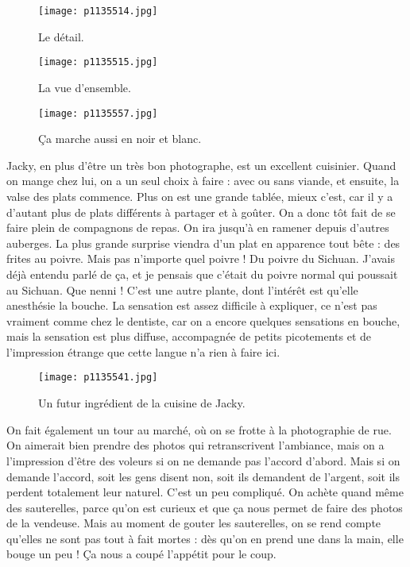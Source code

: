 \documentclass{book}
\begin{document}
\begin{figure}[h]
\centering
\texttt{[image: p1135514.jpg]}
\caption*{Le détail.}
\end{figure}


\begin{figure}[h]
\centering
\texttt{[image: p1135515.jpg]}
\caption*{La vue d'ensemble.}
\end{figure}


\begin{figure}[h]
\centering
\texttt{[image: p1135557.jpg]}
\caption*{Ça marche aussi en noir et blanc.}
\end{figure}

Jacky, en plus d'être un très bon photographe, est un excellent cuisinier. Quand on mange chez lui, on a un seul choix à faire : avec ou sans viande, et ensuite, la valse des plats commence. Plus on est une grande tablée, mieux c'est, car il y a d'autant plus de plats différents à partager et à goûter. On a donc tôt fait de se faire plein de compagnons de repas. On ira jusqu'à en ramener depuis d'autres auberges. La plus grande surprise viendra d'un plat en apparence tout bête : des frites au poivre. Mais pas n'importe quel poivre ! Du poivre du Sichuan. J'avais déjà entendu parlé de ça, et je pensais que c'était du poivre normal qui poussait au Sichuan. Que nenni ! C'est une autre plante, dont l'intérêt est qu'elle anesthésie la bouche. La sensation est assez difficile à expliquer, ce n'est pas vraiment comme chez le dentiste, car on a encore quelques sensations en bouche, mais la sensation est plus diffuse, accompagnée de petits picotements et de l'impression étrange que cette langue n'a rien à faire ici.


\begin{figure}[h]
\centering
\texttt{[image: p1135541.jpg]}
\caption*{Un futur ingrédient de la cuisine de Jacky.}
\end{figure}

On fait également un tour au marché, où on se frotte à la photographie de rue. On aimerait bien prendre des photos qui retranscrivent l'ambiance, mais on a l'impression d'être des voleurs si on ne demande pas l'accord d'abord. Mais si on demande l'accord, soit les gens disent non, soit ils demandent de l'argent, soit ils perdent totalement leur naturel. C'est un peu compliqué. On achète quand même des sauterelles, parce qu'on est curieux et que ça nous permet de faire des photos de la vendeuse. Mais au moment de gouter les sauterelles, on se rend compte qu'elles ne sont pas tout à fait mortes : dès qu'on en prend une dans la main, elle bouge un peu ! Ça nous a coupé l'appétit pour le coup.
\end{document}
